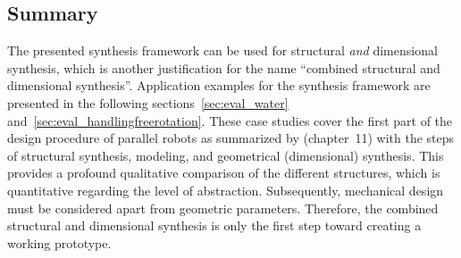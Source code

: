 \subsection{Summary}

The presented synthesis framework can be used for structural \emph{and} dimensional synthesis, which is another justification for the name ``combined structural and dimensional synthesis''.
Application examples for the synthesis framework are presented in the following sections~\ref{sec:eval_water} and~\ref{sec:eval_handlingfreerotation}.
%
These case studies cover the first part of the design procedure of parallel robots as summarized by \cite{Merlet2006} (chapter~11) with the steps of structural synthesis, modeling, and geometrical (dimensional) synthesis.
This provides a profound qualitative comparison of the different structures, which is quantitative regarding the level of abstraction.
Subsequently, mechanical design must be considered apart from geometric parameters.
Therefore, the combined structural and dimensional synthesis is only the first step toward creating a working prototype.
